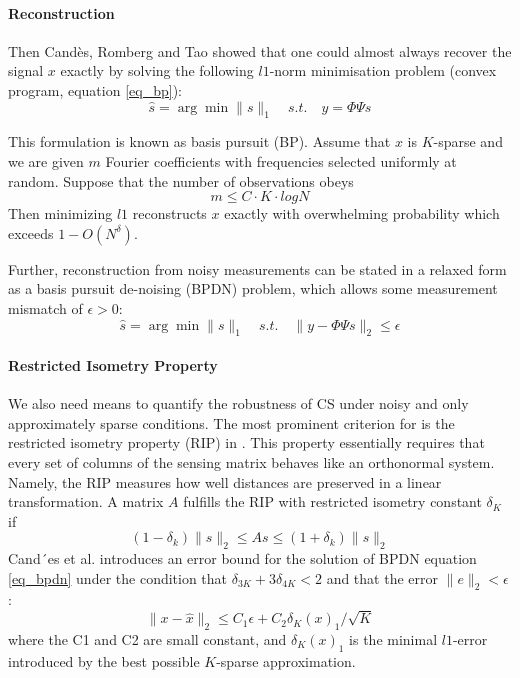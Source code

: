 \paragraph{Reconstruction}
Then Candès, Romberg and Tao \cite{candes2006robust} showed that one could almost always recover the signal $x$ exactly by solving the following $l1$-norm minimisation problem (convex program, equation \ref{eq_bp}):
\begin{equation}
\label{eq_bp}
\hat s = \arg\min \| s \|_1 \quad s.t. \quad  y = \Phi \Psi s
\end{equation} 
\begin{theorem}\label{thm_bp}
This formulation is known as basis pursuit (BP). Assume that $x$ is $K$-sparse and we are given $m$ Fourier coefficients with frequencies selected uniformly at random. Suppose that the number of observations obeys
\begin{equation}
\label{eq_observation}
m \leq C \cdot K \cdot log N 
\end{equation} 
Then minimizing $l1$ reconstructs $x$ exactly with overwhelming probability which exceeds $1 − O(N^\delta)$.
\end{theorem}
Further, reconstruction from noisy measurements can be stated in a relaxed form as a basis pursuit de-noising (BPDN) \cite{chen1998atomic} problem, which allows some measurement mismatch of $\epsilon > 0$: 
\begin{equation}
\label{eq_bpdn}
\hat s = \arg\min \| s \|_1 \quad s.t. \quad  \| y - \Phi \Psi s \|_2 \leq \epsilon
\end{equation} 

\paragraph{Restricted Isometry Property}
We also need means to quantify the robustness of CS under noisy and only approximately sparse conditions. The most prominent criterion for is the restricted isometry property (RIP) in \cite{candes2005decoding}. This property essentially requires that every set of columns of the sensing matrix behaves like an orthonormal system. Namely, the RIP measures how well distances are preserved in a linear transformation. A matrix $A$ fulfills the RIP with restricted isometry constant $\delta_K$ if
\begin{equation}
\label{eqn_rip1}
(1-\delta_k) \| s \|_2 \leq A s \leq (1+\delta_k) \| s \|_2
\end{equation}
Cand´es et al. \cite{candes2006stable} introduces an error bound for the solution of BPDN equation \ref{eq_bpdn} under the condition that $\delta_{3K} + 3 \delta_{4K} < 2$ and that the error $\|e\|_2 < \epsilon$:
\begin{equation}
\label{cs_error_bound}
\| x - \hat x \|_2 \leq C_1 \epsilon + C_2 \delta_K (x)_1 / \sqrt{K} 
\end{equation}
where the C1 and C2 are small constant, and $\delta_K (x)_1$ is the minimal $l1$-error introduced by the best possible $K$-sparse approximation. 

